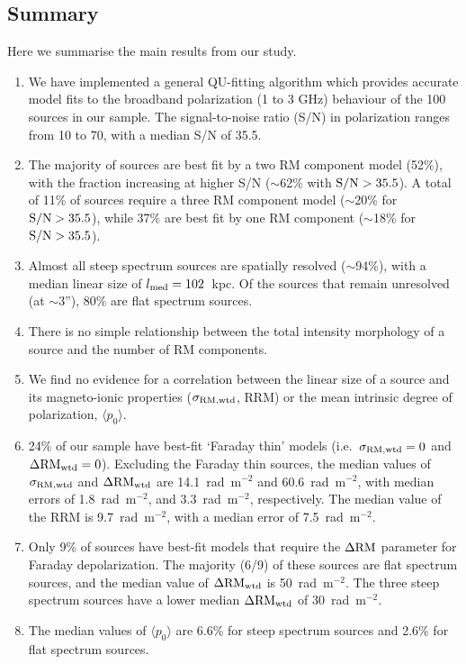 \documentclass{mnras}
\newcommand*\sigmaRMwtd{\sigma_{\rm RM, wtd}}
\newcommand*\gradRMwtd{\Delta{\rm RM_{wtd}}}
\newcommand*\DeltaRMwtd{\Delta{\rm RM_{wtd}}}
\newcommand*\gradRM{\Delta{\rm RM}}
\begin{document}
\subsection{Summary}
Here we summarise the main results from our study. 
\begin{enumerate}
\item We have implemented a general QU-fitting algorithm which provides accurate model fits to the broadband polarization (1 to 3 GHz) behaviour of the 100 sources in our sample. The signal-to-noise ratio (S/N) in polarization ranges from 10 to 70, with a median S/N of 35.5. 
 \item The majority of sources are best fit by a two RM component model (52\%), with the fraction increasing at higher S/N ($\sim$62\% with ${\rm S/N} > 35.5$). A total of 11\% of sources require a three RM component model ($\sim$20\% for ${\rm S/N} > 35.5$), while 37\% are best fit by one RM component ($\sim$18\% for ${\rm S/N} > 35.5$).
 \item Almost all steep spectrum sources are spatially resolved ($\sim$94\%), with a median linear size of $l_{\rm med}=102$~kpc. Of the sources that remain unresolved (at $\sim$3''), 80\% are flat spectrum sources. 
 \item There is no simple relationship between the total intensity morphology of a source and the number of RM components. 
 \item We find no evidence for a correlation between the linear size of a source and its magneto-ionic properties ($\sigmaRMwtd$, RRM) or the mean intrinsic degree of polarization, $\langle p_0 \rangle$. 
 \item 24\% of our sample have best-fit `Faraday thin' models (i.e.~$\sigmaRMwtd=0$ and $\DeltaRMwtd=0$). Excluding the Faraday thin sources, the median values of $\sigmaRMwtd$ and $\gradRMwtd$ are 14.1~rad~m$^{-2}$ and 60.6~rad~m$^{-2}$, with median errors of 1.8~rad~m$^{-2}$, and 3.3~rad~m$^{-2}$, respectively. The median value of the RRM is 9.7~rad~m$^{-2}$, with a median error of 7.5~rad~m$^{-2}$.
 \item Only 9\% of sources have best-fit models that require the $\gradRM$ parameter for Faraday depolarization. The majority (6/9) of these sources are flat spectrum sources, and the median value of $\gradRMwtd$ is 50~rad~m$^{-2}$. The three steep spectrum sources have a lower median $\gradRMwtd$ of 30~rad~m$^{-2}$. 
 \item The median values of $\langle p_0 \rangle$ are 6.6\% for steep spectrum sources and 2.6\% for flat spectrum sources.  

\end{enumerate}
\end{document}
